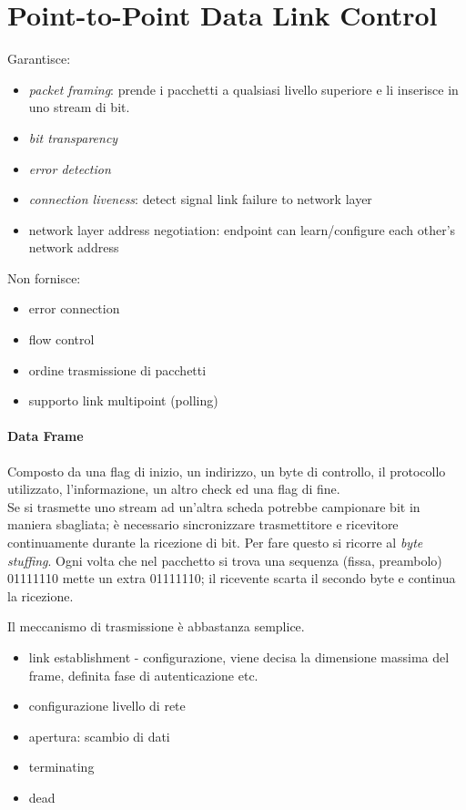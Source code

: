 \section{Point-to-Point Data Link Control}
Garantisce:
\begin{itemize}
	\item \textit{packet framing}: prende i pacchetti a qualsiasi livello superiore e li inserisce in uno stream di bit.
	\item \textit{bit transparency}
	\item \textit{error detection}
	\item \textit{connection liveness}: detect signal link failure to network layer
	\item network layer address negotiation: endpoint can learn/configure each other's network address	
\end{itemize}
Non fornisce:
\begin{itemize}
	\item error connection
	\item flow control
	\item ordine trasmissione di pacchetti
	\item supporto link multipoint (polling)
\end{itemize}
\paragraph{Data Frame} Composto da una flag di inizio, un indirizzo, un byte di controllo, il protocollo utilizzato, l'informazione, un altro check ed una flag di fine.\\
Se si trasmette uno stream ad un'altra scheda potrebbe campionare bit in maniera sbagliata; è necessario sincronizzare trasmettitore e ricevitore continuamente durante la ricezione di bit. Per fare questo si ricorre al \textit{byte stuffing}.
Ogni volta che nel pacchetto si trova una sequenza (fissa, preambolo) 01111110 mette un extra 01111110; il ricevente scarta il secondo byte e continua la ricezione.

Il meccanismo di trasmissione è abbastanza semplice.
\begin{itemize}
	\item link establishment - configurazione, viene decisa la dimensione massima del frame, definita fase di autenticazione etc.
	\item configurazione livello di rete
	\item apertura: scambio di dati
	\item terminating
	\item dead
\end{itemize}